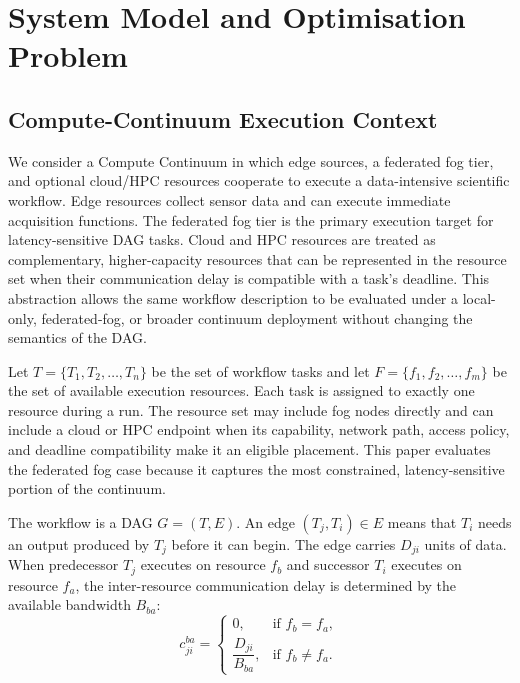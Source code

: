 \section{System Model and Optimisation Problem}
\label{sec:system_model}

\subsection{Compute-Continuum Execution Context}

We consider a Compute Continuum in which edge sources, a federated fog tier, and optional cloud/HPC resources cooperate to execute a data-intensive scientific workflow. Edge resources collect sensor data and can execute immediate acquisition functions. The federated fog tier is the primary execution target for latency-sensitive DAG tasks. Cloud and HPC resources are treated as complementary, higher-capacity resources that can be represented in the resource set when their communication delay is compatible with a task's deadline. This abstraction allows the same workflow description to be evaluated under a local-only, federated-fog, or broader continuum deployment without changing the semantics of the DAG.

Let $T=\{T_1,T_2,\ldots,T_n\}$ be the set of workflow tasks and let $F=\{f_1,f_2,\ldots,f_m\}$ be the set of available execution resources. Each task is assigned to exactly one resource during a run. The resource set may include fog nodes directly and can include a cloud or HPC endpoint when its capability, network path, access policy, and deadline compatibility make it an eligible placement. This paper evaluates the federated fog case because it captures the most constrained, latency-sensitive portion of the continuum.

The workflow is a DAG $G=(T,E)$. An edge $(T_j,T_i)\in E$ means that $T_i$ needs an output produced by $T_j$ before it can begin. The edge carries $D_{ji}$ units of data. When predecessor $T_j$ executes on resource $f_b$ and successor $T_i$ executes on resource $f_a$, the inter-resource communication delay is determined by the available bandwidth $B_{ba}$:
\begin{equation}
 c_{ji}^{ba}=\begin{cases}
 0, & \text{if } f_b=f_a,\\[2pt]
 \dfrac{D_{ji}}{B_{ba}}, & \text{if } f_b\neq f_a.
 \end{cases}
 \label{eq:continuum_comm_delay}
\end{equation}

